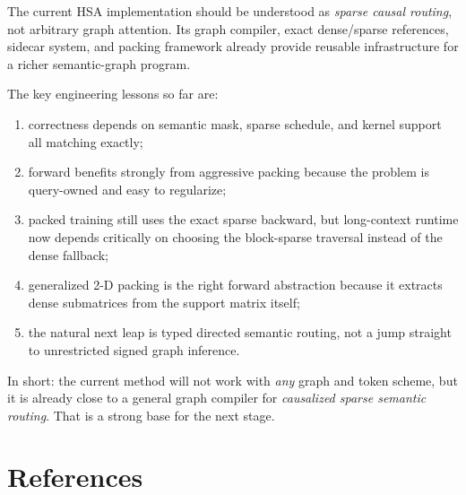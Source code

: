 \documentclass[11pt]{article}
\begin{document}
The current HSA implementation should be understood as \emph{sparse causal
routing}, not arbitrary graph attention. Its graph compiler, exact dense/sparse
references, sidecar system, and packing framework already provide reusable
infrastructure for a richer semantic-graph program.

The key engineering lessons so far are:
\begin{enumerate}[leftmargin=1.5em]
    \item correctness depends on semantic mask, sparse schedule, and kernel
    support all matching exactly;
    \item forward benefits strongly from aggressive packing because the problem
    is query-owned and easy to regularize;
    \item packed training still uses the exact sparse backward, but long-context
    runtime now depends critically on choosing the block-sparse traversal
    instead of the dense fallback;
    \item generalized 2-D packing is the right forward abstraction because it
    extracts dense submatrices from the support matrix itself;
    \item the natural next leap is typed directed semantic routing, not a jump
    straight to unrestricted signed graph inference.
\end{enumerate}

In short: the current method will not work with \emph{any} graph and token
scheme, but it is already close to a general graph compiler for \emph{causalized
sparse semantic routing}. That is a strong base for the next stage.

\section*{References}
\end{document}
